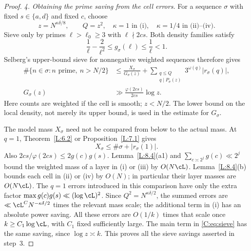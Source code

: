 \begin{proof}
\smallskip\noindent
\emph{4. Obtaining the prime saving from the cell errors.}
For a sequence $\sigma$ with fixed $s\in\{a,d\}$ and fixed $c$, choose
\[
 z=N^{\kappa\delta/8},\qquad Q=z^2,
 \quad \kappa=1\text{ in (i)},\quad \kappa=1/4\text{ in (ii)--(iv)}.
\]
Sieve only by primes $\ell>\ell_0\geq3$ with $\ell\nmid2cs$.
Both density families satisfy
\[
 \frac1\ell-\frac2{\ell^2}\leq g_\sigma(\ell)\leq\frac1\ell<1.
\]
Selberg's upper-bound sieve \cite[Theorem~4.1 and Lemma~4.1]{HR}
for nonnegative weighted sequences therefore gives
\begin{equation}\label{C:eq:sieve}
 \begin{aligned}
 \#\{n\in\sigma:n\text{ prime},\ n>N/2\}
 &\leq\frac{X_\sigma}{G_\sigma(z)}+
 \sum_{\substack{q\leq Q\\q\mid P_\sigma(z)}}
 3^{\omega(q)}|r_\sigma(q)|,\\
 G_\sigma(z)&\gg\frac{\varphi(2cs)}{2cs}\log z.
 \end{aligned}
\end{equation}
Here counts are weighted if the cell is smooth; $z<N/2$.
The lower bound on the local density, not merely its upper bound,
is used in the estimate for $G_\sigma$.

The model mass $X_\sigma$ need not be compared from below to the actual
mass.  At $q=1$, Theorem~\ref{L:6.2} or Proposition~\ref{L:7.1} gives
\[
 X_\sigma\leq\#\sigma+|r_\sigma(1)|.
\]
Also $2cs/\varphi(2cs)\leq2g(c)g(s)$.
Lemma~\ref{L:8.4}(a1) and $\sum_{c\asymp2^j}g(c)\ll2^j$ bound
the weighted mass of a layer in (i) or (iii) by $O(N\cL)$.
Lemma~\ref{L:8.4}(b) bounds each cell in (ii) or (iv) by $O(N)$;
in particular their layer masses are $O(N\cL)$.
The $q=1$ errors introduced in this comparison have only the extra
factor $\max g(c)g(s)\ll(\log\cL)^2$.
Since $Q^2=N^{\kappa\delta/2}$, the summed errors are
$\ll\cL^CN^{-\kappa\delta/2}$ times the relevant mass scale;
the additional term in (i) has an absolute power saving.
All these errors are $O(1/k)$ times that scale once
$k\geq C_1\log\cL$, with $C_1$ fixed sufficiently large.
The main term in \eqref{C:eq:sieve} has the same saving, since
$\log z\asymp k$.  This proves all the sieve savings asserted in step~3.


\end{proof}
